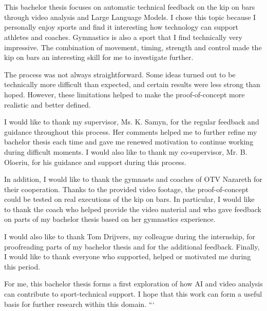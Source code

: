 
\chapter*{}%
\label{ch:voorwoord}

This bachelor thesis focuses on automatic technical feedback on the kip on bars through video analysis and Large Language Models. I chose this topic because I personally enjoy sports and find it interesting how technology can support athletes and coaches. Gymnastics is also a sport that I find technically very impressive. The combination of movement, timing, strength and control made the kip on bars an interesting skill for me to investigate further.

The process was not always straightforward. Some ideas turned out to be technically more difficult than expected, and certain results were less strong than hoped. However, these limitations helped to make the proof-of-concept more realistic and better defined.

I would like to thank my supervisor, Ms. K. Samyn, for the regular feedback and guidance throughout this process. Her comments helped me to further refine my bachelor thesis each time and gave me renewed motivation to continue working during difficult moments. I would also like to thank my co-supervisor, Mr. B. Oloeriu, for his guidance and support during this process.

In addition, I would like to thank the gymnasts and coaches of OTV Nazareth for their cooperation. Thanks to the provided video footage, the proof-of-concept could be tested on real executions of the kip on bars. In particular, I would like to thank the coach who helped provide the video material and who gave feedback on parts of my bachelor thesis based on her gymnastics experience.

I would also like to thank Tom Drijvers, my colleague during the internship, for proofreading parts of my bachelor thesis and for the additional feedback. Finally, I would like to thank everyone who supported, helped or motivated me during this period.

For me, this bachelor thesis forms a first exploration of how AI and video analysis can contribute to sport-technical support. I hope that this work can form a useful basis for further research within this domain.
```

